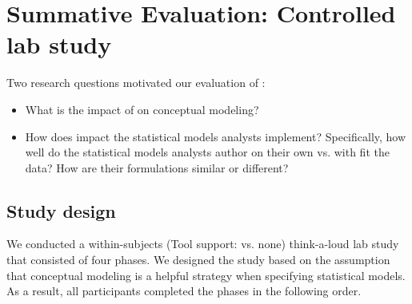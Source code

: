 \section{Summative Evaluation: Controlled lab study} \label{sec:summativeEval}

Two research questions motivated our evaluation of \rTisane:

\begin{itemize}
    \item \evalConceptualModels What is the impact of \rTisane on conceptual
    modeling?
    \item \evalStatisticalModels How does \rTisane impact the statistical models
    analysts implement? Specifically, how well do the statistical models
    analysts author on their own vs. with \rTisane fit the data? How are their
    formulations similar or different?
\end{itemize}

\subsection{Study design}
We conducted a within-subjects (Tool support: \rTisane vs. none) think-a-loud
lab study that consisted of four phases. We designed the study based on the
assumption that conceptual modeling is a helpful strategy when specifying
statistical models. As a result, all participants completed the phases in the
following order.

